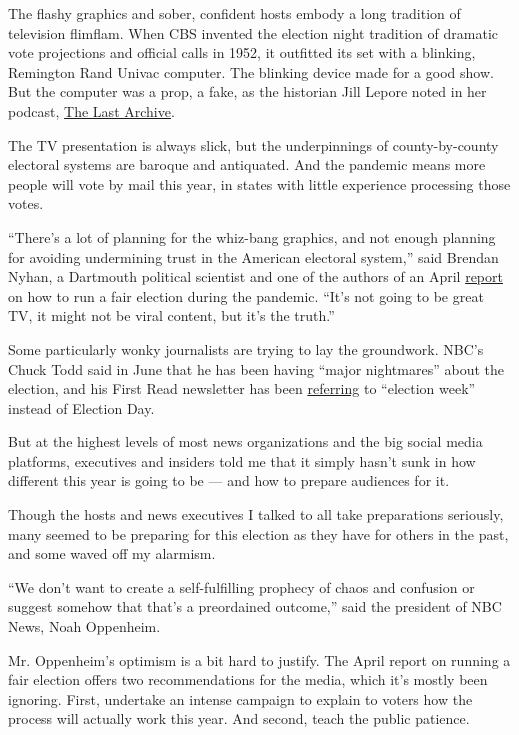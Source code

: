 The flashy graphics and sober, confident hosts embody a long tradition
of television flimflam. When CBS invented the election night tradition
of dramatic vote projections and official calls in 1952, it outfitted
its set with a blinking, Remington Rand Univac computer. The blinking
device made for a good show. But the computer was a prop, a fake, as the
historian Jill Lepore noted in her podcast,
\href{https://www.thelastarchive.com/}{The Last Archive}.

The TV presentation is always slick, but the underpinnings of
county-by-county electoral systems are baroque and antiquated. And the
pandemic means more people will vote by mail this year, in states with
little experience processing those votes.

``There's a lot of planning for the whiz-bang graphics, and not enough
planning for avoiding undermining trust in the American electoral
system,'' said Brendan Nyhan, a Dartmouth political scientist and one of
the authors of an April
\href{https://www.law.uci.edu/faculty/full-time/hasen/2020ElectionReport.pdf}{report}
on how to run a fair election during the pandemic. ``It's not going to
be great TV, it might not be viral content, but it's the truth.''

Some particularly wonky journalists are trying to lay the groundwork.
NBC's Chuck Todd said in June that he has been having ``major
nightmares'' about the election, and his First Read newsletter has been
\href{https://www.nbcnews.com/politics/meet-the-press/say-goodbye-election-night-hello-election-week-n1228206}{referring}
to ``election week'' instead of Election Day.

But at the highest levels of most news organizations and the big social
media platforms, executives and insiders told me that it simply hasn't
sunk in how different this year is going to be --- and how to prepare
audiences for it.

Though the hosts and news executives I talked to all take preparations
seriously, many seemed to be preparing for this election as they have
for others in the past, and some waved off my alarmism.

``We don't want to create a self-fulfilling prophecy of chaos and
confusion or suggest somehow that that's a preordained outcome,'' said
the president of NBC News, Noah Oppenheim.

Mr. Oppenheim's optimism is a bit hard to justify. The April report on
running a fair election offers two recommendations for the media, which
it's mostly been ignoring. First, undertake an intense campaign to
explain to voters how the process will actually work this year. And
second, teach the public patience.

